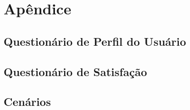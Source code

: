 \newpage
\appendix
\chapter{Apêndice}
\section{Questionário de Perfil do Usuário}


\section{Questionário de Satisfação} 
\section{Cenários}

